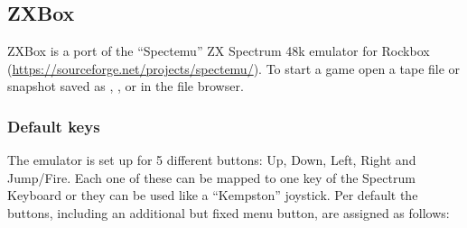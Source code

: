 \subsection{ZXBox}
\label{ref:ZXBox}
ZXBox is a port of the ``Spectemu'' ZX Spectrum 48k emulator for Rockbox
(\url{https://sourceforge.net/projects/spectemu/}).
To start a game open a tape file or snapshot saved as
, ,  or  in the file browser.\\

\subsubsection{Default keys}
The emulator is set up for 5 different buttons: Up, Down, Left, Right and
Jump/Fire. Each one of these can be mapped to one key of the Spectrum Keyboard
or they can be used like a ``Kempston'' joystick. Per default the buttons,
including an additional but fixed menu button, are assigned as follows:

